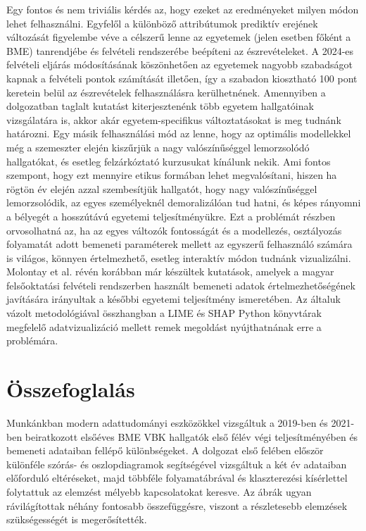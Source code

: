 \documentclass[12pt]{article}
\begin{document}
Egy fontos és nem triviális kérdés az, hogy ezeket az eredményeket milyen módon lehet felhasználni. Egyfelől a különböző attribútumok prediktív erejének változását figyelembe véve a célszerű lenne az egyetemek (jelen esetben főként a BME) tanrendjébe és felvételi rendszerébe beépíteni az észrevételeket. A 2024-es felvételi eljárás módosításának köszönhetően az egyetemek nagyobb szabadságot kapnak a felvételi pontok számítását illetően, így a szabadon kiosztható 100 pont keretein belül az észrevételek felhasználásra kerülhetnének. Amennyiben a dolgozatban taglalt kutatást kiterjesztenénk több egyetem hallgatóinak vizsgálatára is, akkor akár egyetem-specifikus változtatásokat is meg tudnánk határozni. Egy másik felhasználási mód az lenne, hogy az optimális modellekkel még a szemeszter elején kiszűrjük a nagy valószínűséggel lemorzsolódó hallgatókat, és esetleg felzárkóztató kurzusukat kínálunk nekik. Ami fontos szempont, hogy ezt mennyire etikus formában lehet megvalósítani, hiszen ha rögtön év elején azzal szembesítjük hallgatót, hogy nagy valószínűséggel lemorzsolódik, az egyes személyeknél demoralizálóan tud hatni, és képes rányomni a bélyegét a hosszútávú egyetemi teljesítményükre. Ezt a problémát részben orvosolhatná az, ha az egyes változók fontosságát és a modellezés, osztályozás folyamatát adott bemeneti paraméterek mellett az egyszerű felhasználó számára is világos, könnyen értelmezhető, esetleg interaktív módon tudnánk vizualizálni. Molontay et al. \cite{molontay1, molontay2} révén korábban már készültek kutatások, amelyek a magyar felsőoktatási felvételi rendszerben használt bemeneti adatok értelmezhetőségének javítására irányultak a későbbi egyetemi teljesítmény ismeretében. Az általuk vázolt metodológiával összhangban a LIME \cite{lime} és SHAP \cite{shap} Python könyvtárak megfelelő adatvizualizáció mellett remek megoldást nyújthatnának erre a problémára. 



\section{Összefoglalás}


Munkánkban modern adattudományi eszközökkel vizsgáltuk a 2019-ben és 2021-ben beiratkozott elsőéves BME VBK hallgatók első félév végi teljesítményében és bemeneti adataiban fellépő különbségeket. A dolgozat első felében először különféle szórás- és oszlopdiagramok segítségével vizsgáltuk a két év adataiban előforduló eltéréseket, majd többféle folyamatábrával és klaszterezési kísérlettel folytattuk az elemzést mélyebb kapcsolatokat keresve. Az ábrák ugyan rávilágítottak néhány fontosabb összefüggésre, viszont a részletesebb elemzések szükségességét is megerősítették.
\end{document}
